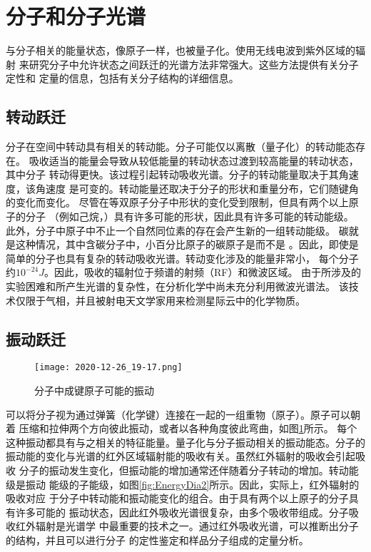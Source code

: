 \section{分子和分子光谱}
与分子相关的能量状态，像原子一样，也被量子化。使用无线电波到紫外区域的辐射
来研究分子中允许状态之间跃迁的光谱方法非常强大。这些方法提供有关分子定性和
定量的信息，包括有关分子结构的详细信息。
\subsection{转动跃迁}
分子在空间中转动具有相关的转动能。分子可能仅以离散（量子化）的转动能态存在。
吸收适当的能量会导致从较低能量的转动状态过渡到较高能量的转动状态，其中分子
转动得更快。该过程引起转动吸收光谱。分子的转动能量取决于其角速度，该角速度
是可变的。转动能量还取决于分子的形状和重量分布，它们随键角的变化而变化。
尽管在等双原子分子中形状的变化受到限制，但具有两个以上原子的分子
（例如己烷，）具有许多可能的形状，因此具有许多可能的转动能级。
此外，分子中原子中不止一个自然同位素的存在会产生新的一组转动能级。
碳就是这种情况，其中含碳分子中，小百分比原子的碳原子是而不是
。因此，即使是简单的分子也具有复杂的转动吸收光谱。转动变化涉及的能量非常小，
每个分子约$10^{-24}J$。因此，吸收的辐射位于频谱的射频（RF）和微波区域。
由于所涉及的实验困难和所产生光谱的复杂性，在分析化学中尚未充分利用微波光谱法。
该技术仅限于气相，并且被射电天文学家用来检测星际云中的化学物质。
\subsection{振动跃迁}
\begin{figure}[htpb]
    \centering
    \texttt{[image: 2020-12-26\_19-17.png]}
    \caption{分子中成键原子可能的振动}
    \label{fig:2.7}
\end{figure}
可以将分子视为通过弹簧（化学键）连接在一起的一组重物（原子）。原子可以朝着
压缩和拉伸两个方向彼此振动，或者以各种角度彼此弯曲，如图\ref{fig:2.7}所示。
每个这种振动都具有与之相关的特征能量。量子化与分子振动相关的振动能态。分子的
振动能的变化与光谱的红外区域辐射能的吸收有关。虽然红外辐射的吸收会引起吸收
分子的振动发生变化，但振动能的增加通常还伴随着分子转动的增加。转动能级是振动
能级的子能级，如图\ref{fig:EnergyDia2}所示。因此，实际上，红外辐射的吸收对应
于分子中转动能和振动能变化的组合。由于具有两个以上原子的分子具有许多可能的
振动状态，因此红外吸收光谱很复杂，由多个吸收带组成。分子吸收红外辐射是光谱学
中最重要的技术之一。通过红外吸收光谱，可以推断出分子的结构，并且可以进行分子
的定性鉴定和样品分子组成的定量分析。
